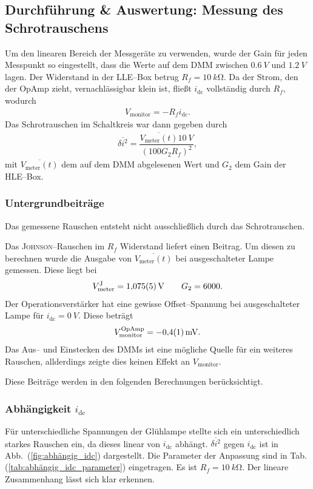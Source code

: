 \documentclass[sn-mathphys-num,iicol]{sn-jnl}
\theoremstyle{thmstyleone}
\theoremstyle{thmstyletwo}
\theoremstyle{thmstylethree}
\begin{document}
\subsection{Durchführung \& Auswertung: Messung des Schrotrauschens}
Um den linearen Bereich der Messgeräte zu verwenden, wurde der Gain für jeden Messpunkt so eingestellt, dass die Werte auf dem DMM zwischen $\SI{0.6}{V}$ und $\SI{1.2}{V}$ lagen.
Der Widerstand in der LLE--Box betrug $R_f=\SI{10}{k\ohm}$.
Da der Strom, den der OpAmp zieht, vernachlässigbar klein ist, fließt $i_\text{dc}$ vollständig durch $R_f$, wodurch
\begin{align}
	V_\text{monitor}=-R_fi_\text{dc}
	.\end{align}
Das Schrotrauschen im Schaltkreis war dann gegeben durch
\begin{align}
	\overline{\delta i^2}=\dfrac{\overline{V_\text{meter}(t)}\SI{10}{V}}{(100G_2R_f)^2}
	,\end{align}
mit $\overline{V_\text{meter}(t)}$ dem auf dem DMM abgelesenen Wert und $G_2$ dem Gain der HLE--Box.

\subsubsection{Untergrundbeiträge}
Das gemessene Rauschen entsteht nicht ausschließlich durch das Schrotrauschen.

Das \textsc{Johnson}--Rauschen im $R_f$ Widerstand liefert einen Beitrag.
Um diesen zu berechnen wurde die Ausgabe von $\overline{V_\text{meter}(t)}$ bei ausgeschalteter Lampe gemessen.
Diese liegt bei
\begin{align}
	V_\text{meter}^\text{J}=\SI{1.075+-0.005}{V}\qquad G_2=6000
	.\end{align}
Der Operationsverstärker hat eine gewisse Offset--Spannung bei ausgeschalteter Lampe für $i_\text{dc}=\SI{0}{V}$.
Diese beträgt
\begin{align}
	V_\text{monitor}^\text{OpAmp}=\SI{-0.4+-0.1}{mV}
	.\end{align}
Das Aus-- und Einstecken des DMMs ist eine mögliche Quelle für ein weiteres Rauschen, allderdings zeigte dies keinen Effekt an $V_\text{monitor}$.

Diese Beiträge werden in den folgenden Berechnungen berücksichtigt.

\subsubsection{Abhängigkeit $i_\text{dc}$}
Für unterschiedliche Spannungen der Glühlampe stellte sich ein unterschiedlich starkes Rauschen ein, da dieses linear von $i_\text{dc}$ abhängt.
$\overline{\delta i^2}$ gegen $i_\text{dc}$ ist in Abb.\ (\ref{fig:abhängig_idc}) dargestellt.
Die Parameter der Anpassung sind in Tab. (\ref{tab:abhängig_idc_parameter}) eingetragen.
Es ist $R_f=\SI{10}{k\ohm}$.
Der lineare Zusammenhang lässt sich klar erkennen. %
\end{document}

